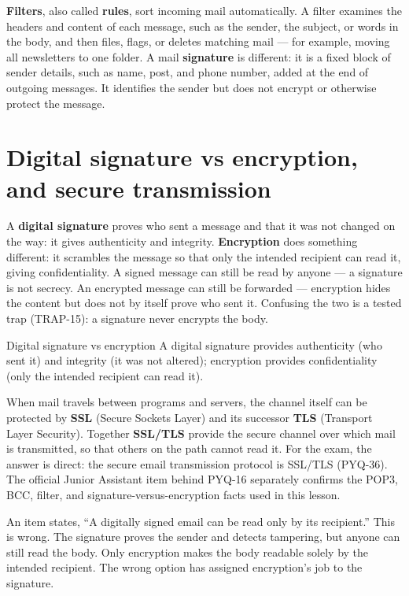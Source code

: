\textbf{Filters}, also called \textbf{rules}, sort incoming mail
automatically. A filter examines the headers and content of each message,
such as the sender, the subject, or words in the body, and then files,
flags, or deletes matching mail --- for example, moving all newsletters to
one folder. A mail \textbf{signature} is different: it is a fixed block of
sender details, such as name, post, and phone number, added at the end of
outgoing messages. It identifies the sender but does not encrypt or
otherwise protect the message.

\section{Digital signature vs encryption, and secure transmission}
A \textbf{digital signature} proves who sent a message and that it was not
changed on the way: it gives authenticity and integrity. \textbf{Encryption}
does something different: it scrambles the message so that only the
intended recipient can read it, giving confidentiality. A signed message
can still be read by anyone --- a signature is not secrecy. An encrypted
message can still be forwarded --- encryption hides the content but does
not by itself prove who sent it. Confusing the two is a tested trap
(TRAP-15): a signature never encrypts the body.

\begin{definitionbox}{Digital signature vs encryption}
A digital signature provides authenticity (who sent it) and integrity (it
was not altered); encryption provides confidentiality (only the intended
recipient can read it).
\end{definitionbox}

When mail travels between programs and servers, the channel itself can be
protected by \textbf{SSL} (Secure Sockets Layer) and its successor
\textbf{TLS} (Transport Layer Security). Together \textbf{SSL/TLS} provide
the secure channel over which mail is transmitted, so that others on the
path cannot read it. For the exam, the answer is direct: the secure email
transmission protocol is SSL/TLS (PYQ-36). The official Junior Assistant
item behind PYQ-16 separately confirms the POP3, BCC, filter, and
signature-versus-encryption facts used in this lesson.

\begin{example}
An item states, ``A digitally signed email can be read only by its
recipient.'' This is wrong. The signature proves the sender and detects
tampering, but anyone can still read the body. Only encryption makes the
body readable solely by the intended recipient. The wrong option has
assigned encryption's job to the signature.
\end{example}

